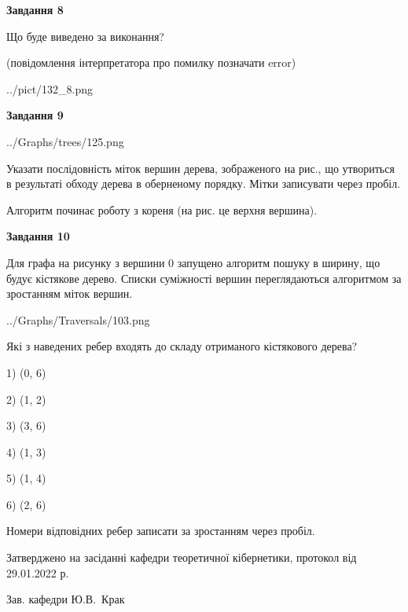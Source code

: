 \documentclass[12pt, ukrainian]{article}
\begin{document}
{\begin {large}
{\begin {center}\textbf{Завдання 8}\end {center}}\par
Що буде виведено за виконання?\par
 (повідомлення інтерпретатора про помилку позначати error)\par
\begin{center}
	{../pict/132_8.png}
\end{center}
\newpage

{\begin {center}\textbf{Завдання 9}\end {center}}\par

\begin{center}
	{../Graphs/trees/125.png}
\end{center}
Указати послідовність міток вершин дерева, зображеного на рис., що утвориться в результаті обходу дерева в оберненому порядку. Мітки записувати через пробіл.\par Алгоритм починає роботу з кореня (на рис. це верхня вершина).\par
\newpage

{\begin {center}\textbf{Завдання 10}\end {center}}\par
Для графа на рисунку з вершини 0 запущено алгоритм пошуку в ширину, що будує кістякове дерево. Списки суміжності вершин переглядаються алгоритмом за зростанням міток вершин.\par
\begin{center}
	{../Graphs/Traversals/103.png}
\end{center}
\par Які з наведених ребер входять до складу отриманого кістякового дерева?\par
1) (0, 6)\par
2) (1, 2)\par
3) (3, 6)\par
4) (1, 3)\par
5) (1, 4)\par
6) (2, 6)\par
{\vskip 15pt} Номери відповідних ребер записати за зростанням через пробіл.\par
\newpage


\end {large}
}
{\smallskip \begin {small} Затверджено на засіданні кафедри теоретичної кібернетики, протокол  від   29.01.2022 р.\par\smallskip\smallskip
{\parbox {6.5 cm}{Зав. кафедри \dotfill Ю.В.~Крак}} \end{small}}
\end{document}
